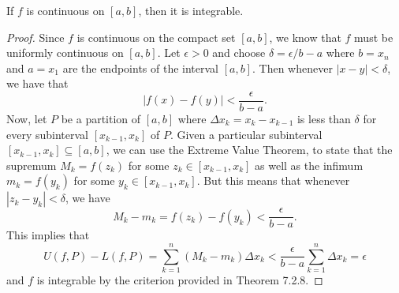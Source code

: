 \begin{theorem}
	If \( f  \) is continuous on \( [a,b] \), then it is integrable.
\end{theorem}

\begin{proof}
	Since \( f  \) is continuous on the compact set \( [a,b]  \), we know that \( f  \) must be uniformly continuous on \( [a,b]  \). Let \( \epsilon > 0  \) and choose \( \delta = \epsilon / b -a  \) where \( b = x_{n}   \) and \( a = x_{1}  \) are the endpoints of the interval \( [a,b ] \). Then whenever \( | x - y  | < \delta  \), we have that 
	\[  | f(x) - f(y)  | < \frac{ \epsilon  }{  b - a  }. \]
	Now, let \( P  \) be a partition of \( [a,b]  \) where \( \Delta x_{ k } = x_{ k } - x _{ k -1 } \) is less than \( \delta  \) for every subinterval \( [x_{k-1 } , x_{k }] \) of \( P  \). Given a particular subinterval \( [x_{k-1}, x_{ k } ] \subseteq [a,b]   \), we can use the Extreme Value Theorem, to state that the supremum \(  M_{k} = f(z_{k })  \) for some \( z_{k } \in [x_{ k-1 } , x_{k}]  \) as well as the infimum \( m_{k } = f(y_{k }) \) for some \( y_{ k } \in [x_{k -1 } , x_{ k }]  \). But this means that whenever \( | z_{k } - y_{k } | < \delta  \), we have 
	\[  M_{k } - m_{k } = f(z_{k}) - f(y_{k } ) < \frac{ \epsilon  }{  b -a  }. \]
	This implies that 
	\[  U(f, P ) - L(f,P ) = \sum_{ k=1 }^{ n } (M_{k } - m_{ k } ) \Delta x_{k} < \frac{ \epsilon  }{ b -a  }  \sum_{ k=1 }^{ n } \Delta x_{k} = \epsilon \]
	and \( f  \) is integrable by the criterion provided in Theorem 7.2.8.
\end{proof}



